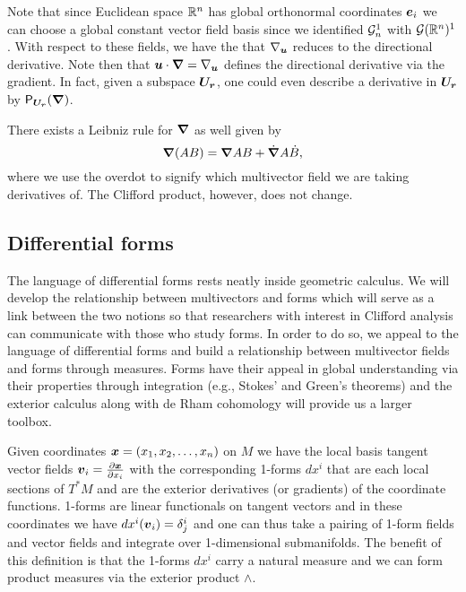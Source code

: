 Note that since Euclidean space $\mathbb{R}^n$ has global orthonormal coordinates $\boldsymbol{e}_i$ we can choose a global constant vector field basis since we identified $\mathcal{G}_n^1$ with $\mathcal{G}(\mathbb{R}^n)^1$. With respect to these fields, we have the that $\nabla_{\boldsymbol{u}}$ reduces to the directional derivative. Note then that $\boldsymbol{u} \cdot \boldsymbol{\nabla} = \nabla_{\boldsymbol{u}}$ defines the directional derivative via the gradient. In fact, given a subspace $\boldsymbol{U_r}$, one could even describe a derivative in $\boldsymbol{U_r}$ by $\mathsf{P}_{\boldsymbol{U_r}}(\boldsymbol{\nabla})$.

There exists a Leibniz rule for $\boldsymbol{\nabla}$ as well given by
\begin{equation}
\boldsymbol{\nabla}(AB) = \boldsymbol{\nabla} A B + \dot{\boldsymbol{\nabla}}A\dot{B},
\end{equation}
where we use the overdot to signify which multivector field we are taking derivatives of. The Clifford product, however, does not change. 

\subsection{Differential forms}
\label{subsec:differential_forms}

The language of differential forms \cite{guillemin_differential_2010} rests neatly inside geometric calculus. We will develop the relationship between multivectors and forms which will serve as a link between the two notions so that researchers with interest in Clifford analysis can communicate with those who study forms. In order to do so, we appeal to the language of differential forms and build a relationship between multivector fields and forms through measures. Forms have their appeal in global understanding via their properties through integration (e.g., Stokes' and Green's theorems) and the exterior calculus along with de Rham cohomology will provide us a larger toolbox.

Given coordinates $\boldsymbol{x}=(x_1,x_2,\dots,x_n)$ on $M$ we have the local basis tangent vector fields $\boldsymbol{v}_i=\frac{\partial \boldsymbol{x}}{\partial x_i}$  with the corresponding 1-forms $dx^i$ that are each local sections of $T^*M$ and are the exterior derivatives (or gradients) of the coordinate functions.  1-forms are linear functionals on tangent vectors and in these coordinates we have $dx^i  (\boldsymbol{v}_i) = \delta^i_j$ and one can thus take a pairing of 1-form fields and vector fields and integrate over 1-dimensional submanifolds. The benefit of this definition is that the 1-forms $dx^i$ carry a natural measure and we can form product measures via the exterior product $\wedge$.

